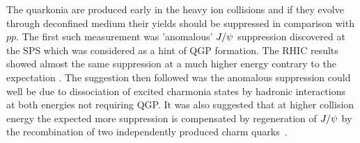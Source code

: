 \documentclass[aps,prc,preprint,superscriptaddress,showpacs,showkeys]{revtex4-1}
\begin{document}
 The quarkonia are produced early in the heavy ion collisions and if they evolve
through deconfined medium their yields should be suppressed in comparison with $pp$. 
 The first such measurement was 'anomalous' $J/\psi$ suppression discovered at the SPS 
which was considered as a hint of QGP formation. The RHIC results showed almost the same suppression at 
a much higher energy contrary to the expectation \cite{Brambilla:2010cs}. The suggestion then followed was 
the anomalous suppression could well be due to dissociation of excited charmonia states by 
hadronic interactions at both energies not requiring QGP.   
  It was also suggested that at higher collision energy the expected more suppression is 
compensated by regeneration of $J/\psi$ by the recombination of two 
independently produced charm quarks~\cite{Andronic_SH1}.
\end{document}
